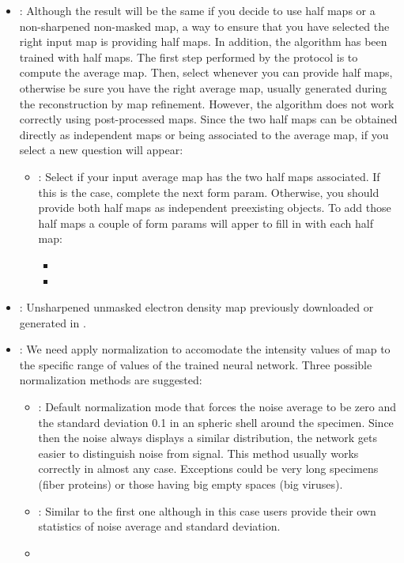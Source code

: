 \begin{itemize}
    \begin{itemize}
        \item {}: Although the result will be the same if you decide to use half maps or a non-sharpened non-masked map, a way to ensure that you have selected the right input map is providing half maps. In addition, the algorithm has been trained with half maps. The first step performed by the protocol is to compute the average map. Then, select  whenever you can provide half maps, otherwise be sure you have the right average map, usually generated during the reconstruction by map refinement. However, the algorithm does not work correctly using post-processed maps. Since the two half maps can be obtained directly as independent maps or being associated to the average map, if you select  a new question will appear:
            \begin{itemize}
            \item {}: Select  if your input average map has the two half maps associated. If this is the case, complete the next form param. Otherwise, you should provide both half maps as independent preexisting \scipion objects. To add those half maps a couple of form params will apper to fill in with each half map:
                \begin{itemize}
                \item {}
                \item {}
                \end{itemize}
            \end{itemize}
        \item {}: Unsharpened unmasked electron density map previously downloaded or generated in \scipion.
        \item {}: We need apply normalization to accomodate the intensity values of map to the specific range of values of the trained neural network. Three possible normalization methods are suggested:
        \begin{itemize}
            \item {}: Default normalization mode that forces the noise average to be zero and the standard deviation 0.1 in an spheric shell around the specimen. Since then the noise always displays a similar distribution, the network gets easier to distinguish noise from signal. This method usually works correctly in almost any case. Exceptions could be very long specimens (fiber proteins) or those having big empty spaces (big viruses).
            \item {}: Similar to the first one although in this case users provide their own statistics of noise average and standard deviation.
            \item {}
        \end{itemize}
        

\end{itemize}
\end{itemize}
